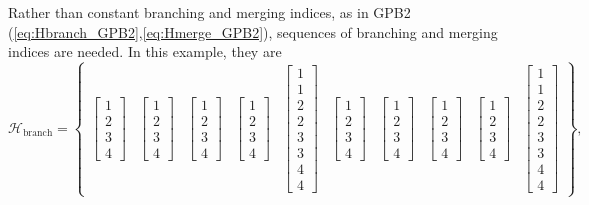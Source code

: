 Rather than constant branching and merging indices, as in GPB2 (\ref{eq:Hbranch_GPB2},\ref{eq:Hmerge_GPB2}), sequences of branching and merging indices are needed. In this example, they are
\begin{equation} \label{eq:Hbranch_SFex2}
	\mathcal{H}_{\text{branch}} = \begin{Bmatrix}
		\begin{bmatrix} 1 \\ 2 \\ 3 \\ 4 \end{bmatrix} &
		\begin{bmatrix} 1 \\ 2 \\ 3 \\ 4 \end{bmatrix} &
		\begin{bmatrix} 1 \\ 2 \\ 3 \\ 4 \end{bmatrix} &
		\begin{bmatrix} 1 \\ 2 \\ 3 \\ 4 \end{bmatrix} &
		\begin{bmatrix} 1 \\ 1 \\ 2 \\ 2 \\ 3 \\ 3 \\ 4 \\ 4 \end{bmatrix} &
		\begin{bmatrix} 1 \\ 2 \\ 3 \\ 4 \end{bmatrix} &
		\begin{bmatrix} 1 \\ 2 \\ 3 \\ 4 \end{bmatrix} &
		\begin{bmatrix} 1 \\ 2 \\ 3 \\ 4 \end{bmatrix} &
		\begin{bmatrix} 1 \\ 2 \\ 3 \\ 4 \end{bmatrix} &
		\begin{bmatrix} 1 \\ 1 \\ 2 \\ 2 \\ 3 \\ 3 \\ 4 \\ 4 \end{bmatrix}
	\end{Bmatrix},
\end{equation}
